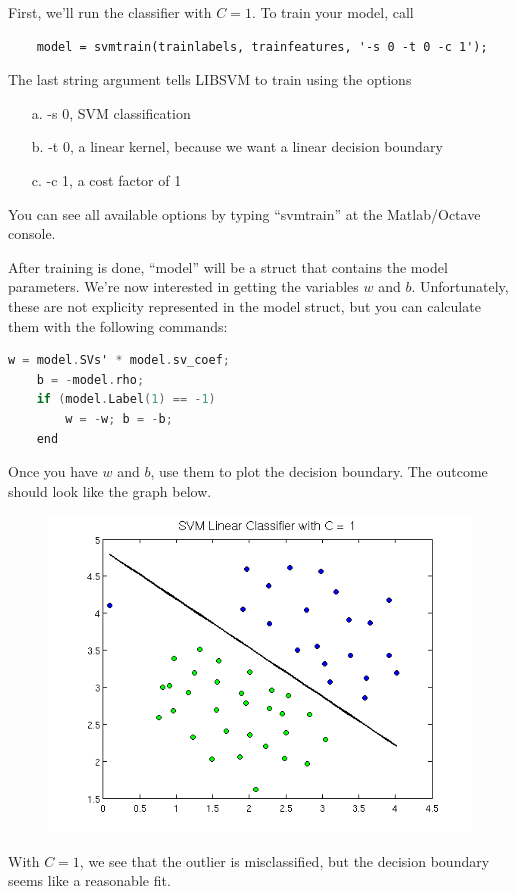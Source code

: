 \documentclass[10pt,a4paper]{article}
\begin{document}
  First, we'll run the classifier with $C = 1$. To train your model, call
  \begin{lstlisting}
    model = svmtrain(trainlabels, trainfeatures, '-s 0 -t 0 -c 1');
  \end{lstlisting}
  The last string argument tells LIBSVM to train using the options
  \begin{itemize}
    \item[a.] -s 0, SVM classification
    \item[b.] -t 0, a linear kernel, because we want a linear decision boundary
    \item[c.] -c 1, a cost factor of 1
  \end{itemize}
  You can see all available options by typing ``svmtrain'' at the Matlab/Octave console.

  After training is done, ``model'' will be a struct that contains the model parameters. We're now interested in getting the variables $w$ and $b$. Unfortunately, these are not explicity represented in the model struct, but you can calculate them with the following commands:
  \begin{lstlisting}[language=C, basicstyle=\footnotesize, showspaces=false]
    w = model.SVs' * model.sv_coef;
    b = -model.rho;
    if (model.Label(1) == -1)
        w = -w; b = -b;
    end
  \end{lstlisting}
  Once you have $w$ and $b$, use them to plot the decision boundary. The outcome should look like the graph below.
  \begin{figure}[htb!]
    \centering
      \includegraphics[width=.7\columnwidth]{twofeature_a}
  \end{figure}
  With $C = 1$, we see that the outlier is misclassified, but the decision boundary seems like a reasonable fit.
\end{document}
